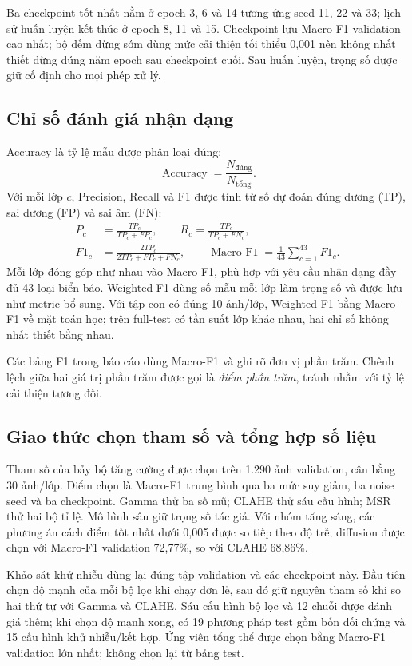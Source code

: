 Ba checkpoint tốt nhất nằm ở epoch 3, 6 và 14 tương ứng seed 11, 22 và 33; lịch sử huấn luyện kết thúc ở epoch 8, 11 và 15. Checkpoint lưu Macro-F1 validation cao nhất; bộ đếm dừng sớm dùng mức cải thiện tối thiểu 0,001 nên không nhất thiết dừng đúng năm epoch sau checkpoint cuối. Sau huấn luyện, trọng số được giữ cố định cho mọi phép xử lý.

\subsection{Chỉ số đánh giá nhận dạng}
Accuracy là tỷ lệ mẫu được phân loại đúng:
\begin{equation}
\operatorname{Accuracy}=\frac{N_{\mathrm{đúng}}}{N_{\mathrm{tổng}}}.
\end{equation}
Với mỗi lớp $c$, Precision, Recall và F1 được tính từ số dự đoán đúng dương (TP), sai dương (FP) và sai âm (FN):
\begin{align}
P_c&=\frac{TP_c}{TP_c+FP_c},\qquad
R_c=\frac{TP_c}{TP_c+FN_c},\\
F1_c&=\frac{2TP_c}{2TP_c+FP_c+FN_c},\qquad
\operatorname{Macro\text{-}F1}=\frac{1}{43}\sum_{c=1}^{43}F1_c.
\end{align}
Mỗi lớp đóng góp như nhau vào Macro-F1, phù hợp với yêu cầu nhận dạng đầy đủ 43 loại biển báo. Weighted-F1 dùng số mẫu mỗi lớp làm trọng số và được lưu như metric bổ sung. Với tập con có đúng 10 ảnh/lớp, Weighted-F1 bằng Macro-F1 về mặt toán học; trên full-test có tần suất lớp khác nhau, hai chỉ số không nhất thiết bằng nhau.

Các bảng F1 trong báo cáo dùng Macro-F1 và ghi rõ đơn vị phần trăm. Chênh lệch giữa hai giá trị phần trăm được gọi là \textit{điểm phần trăm}, tránh nhầm với tỷ lệ cải thiện tương đối.



\subsection{Giao thức chọn tham số và tổng hợp số liệu}
Tham số của bảy bộ tăng cường được chọn trên 1.290 ảnh validation, cân bằng 30 ảnh/lớp. Điểm chọn là Macro-F1 trung bình qua ba mức suy giảm, ba noise seed và ba checkpoint. Gamma thử ba số mũ; CLAHE thử sáu cấu hình; MSR thử hai bộ tỉ lệ. Mô hình sâu giữ trọng số tác giả. Với nhóm tăng sáng, các phương án cách điểm tốt nhất dưới 0,005 được so tiếp theo độ trễ; diffusion được chọn với Macro-F1 validation 72,77\%, so với CLAHE 68,86\%.

Khảo sát khử nhiễu dùng lại đúng tập validation và các checkpoint này. Đầu tiên chọn độ mạnh của mỗi bộ lọc khi chạy đơn lẻ, sau đó giữ nguyên tham số khi so hai thứ tự với Gamma và CLAHE. Sáu cấu hình bộ lọc và 12 chuỗi được đánh giá thêm; khi chọn độ mạnh xong, có 19 phương pháp test gồm bốn đối chứng và 15 cấu hình khử nhiễu/kết hợp. Ứng viên tổng thể được chọn bằng Macro-F1 validation lớn nhất; không chọn lại từ bảng test.

